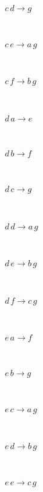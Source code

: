 \begin{minipage}{6in}
$
c\,
 d\rightarrow g
$
\end{minipage}\medskip \\
\begin{minipage}{6in}
$
c\,
 e\rightarrow a\,
 g
$
\end{minipage}\medskip \\
\begin{minipage}{6in}
$
c\,
 f\rightarrow b\,
 g
$
\end{minipage}\medskip \\
\begin{minipage}{6in}
$
d\,
 a\rightarrow e
$
\end{minipage}\medskip \\
\begin{minipage}{6in}
$
d\,
 b\rightarrow f
$
\end{minipage}\medskip \\
\begin{minipage}{6in}
$
d\,
 c\rightarrow g
$
\end{minipage}\medskip \\
\begin{minipage}{6in}
$
d\,
 d\rightarrow a\,
 g
$
\end{minipage}\medskip \\
\begin{minipage}{6in}
$
d\,
 e\rightarrow b\,
 g
$
\end{minipage}\medskip \\
\begin{minipage}{6in}
$
d\,
 f\rightarrow c\,
 g
$
\end{minipage}\medskip \\
\begin{minipage}{6in}
$
e\,
 a\rightarrow f
$
\end{minipage}\medskip \\
\begin{minipage}{6in}
$
e\,
 b\rightarrow g
$
\end{minipage}\medskip \\
\begin{minipage}{6in}
$
e\,
 c\rightarrow a\,
 g
$
\end{minipage}\medskip \\
\begin{minipage}{6in}
$
e\,
 d\rightarrow b\,
 g
$
\end{minipage}\medskip \\
\begin{minipage}{6in}
$
e\,
 e\rightarrow c\,
 g
$
\end{minipage}\medskip \\
